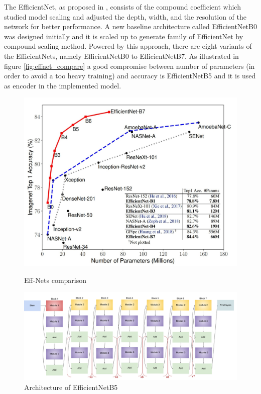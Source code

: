 \documentclass[a4paper,10pt]{report}
\begin{document}
The EfficientNet, as proposed in \cite{effnet}, consists of the compound coefficient which studied model scaling and adjusted the depth, width, and the resolution of the network for better performance.
A new baseline architecture called EfficientNetB0 was designed initially and it is scaled up to generate family of EfficientNet by compound scaling method. Powered by this approach, there are eight variants of the EfficientNets, namely EfficientNetB0 to EfficientNetB7. As illustrated in figure \ref{fig:effnet_compare} a good compromise between number of parameters (in order to avoid a too heavy training) and accuracy is EfficientNetB5 and it is used as encoder in the implemented model. 


\begin{figure}[h]
  \centering\begin{minipage}[b]{0.37\textwidth}
    \includegraphics[width=\textwidth]{assets/img/effnet_compare.png}
\caption{Eff-Nets comparison \cite{effnet}}
\label{fig:effnet_compare}
  \end{minipage}
  \hfill\begin{minipage}[b]{0.62\textwidth}
    \includegraphics[width=\textwidth]{assets/img/effunetB5.png}
    \caption{Architecture of EfficientNetB5 \cite{effnetB5}}
\label{fig:effnetb5}
  \end{minipage}
\end{figure}
\end{document}
